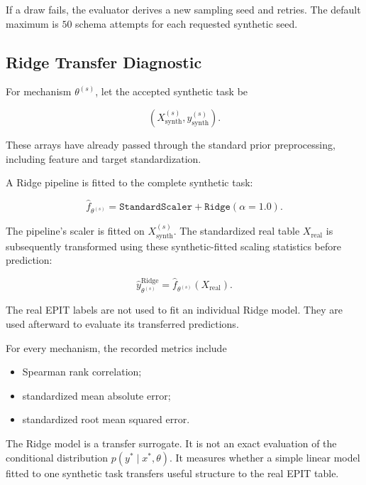 \documentclass{article}
\begin{document}
If a draw fails, the evaluator derives a new sampling seed and retries. The default maximum is \(50\) schema attempts for each requested synthetic seed.

\subsection{Ridge Transfer Diagnostic}

For mechanism \(\theta^{(s)}\), let the accepted synthetic task be

\[
\left(
X_{\mathrm{synth}}^{(s)},
y_{\mathrm{synth}}^{(s)}
\right).
\]

These arrays have already passed through the standard prior preprocessing, including feature and target standardization.

A Ridge pipeline is fitted to the complete synthetic task:

\begin{equation}
\widehat f_{\theta^{(s)}}
=
\texttt{StandardScaler}
+
\texttt{Ridge}(\alpha=1.0).
\label{eq:ridge-surrogate}
\end{equation}

The pipeline's scaler is fitted on \(X_{\mathrm{synth}}^{(s)}\). The standardized real table \(X_{\mathrm{real}}\) is subsequently transformed using these synthetic-fitted scaling statistics before prediction:

\begin{equation}
\widehat y_{\theta^{(s)}}^{\mathrm{Ridge}}
=
\widehat f_{\theta^{(s)}}
\left(
X_{\mathrm{real}}
\right).
\label{eq:theta-ridge-prediction}
\end{equation}

The real EPIT labels are not used to fit an individual Ridge model. They are used afterward to evaluate its transferred predictions.

For every mechanism, the recorded metrics include

\begin{itemize}
    \item Spearman rank correlation;
    \item standardized mean absolute error;
    \item standardized root mean squared error.
\end{itemize}

The Ridge model is a transfer surrogate. It is not an exact evaluation of the conditional distribution \(p(y^\ast\mid x^\ast,\theta)\). It measures whether a simple linear model fitted to one synthetic task transfers useful structure to the real EPIT table.
\end{document}
